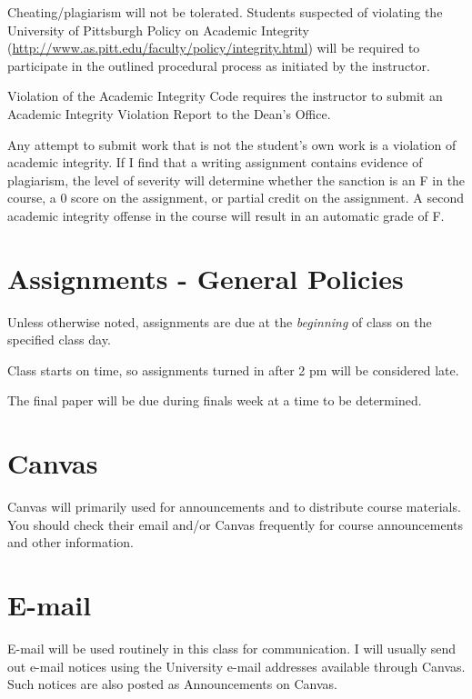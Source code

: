 \documentclass[
]{book}
\begin{document}
Cheating/plagiarism will not be tolerated. Students suspected of violating the University of Pittsburgh Policy on Academic Integrity (\url{http://www.as.pitt.edu/faculty/policy/integrity.html}) will be required to participate in the outlined procedural process as initiated by the instructor.

Violation of the Academic Integrity Code requires the instructor to submit an Academic Integrity Violation Report to the Dean's Office.

Any attempt to submit work that is not the student's own work is a violation of academic integrity. If I find that a writing assignment contains evidence of plagiarism, the level of severity will determine whether the sanction is an F in the course, a 0 score on the assignment, or partial credit on the assignment. A second academic integrity offense in the course will result in an automatic grade of F.

\hypertarget{assignments---general-policies}{%
\chapter{Assignments - General Policies}\label{assignments---general-policies}}

Unless otherwise noted, assignments are due at the \emph{beginning} of class on the specified class day.

Class starts on time, so assignments turned in after 2 pm will be considered late.

The final paper will be due during finals week at a time to be determined.

\hypertarget{canvas}{%
\chapter{Canvas}\label{canvas}}

Canvas will primarily used for announcements and to distribute course materials. You should check their email and/or Canvas frequently for course announcements and other information.

\hypertarget{e-mail}{%
\chapter{E-mail}\label{e-mail}}

E-mail will be used routinely in this class for communication. I will usually send out e-mail notices using the University e-mail addresses available through Canvas. Such notices are also posted as Announcements on Canvas.
\end{document}
